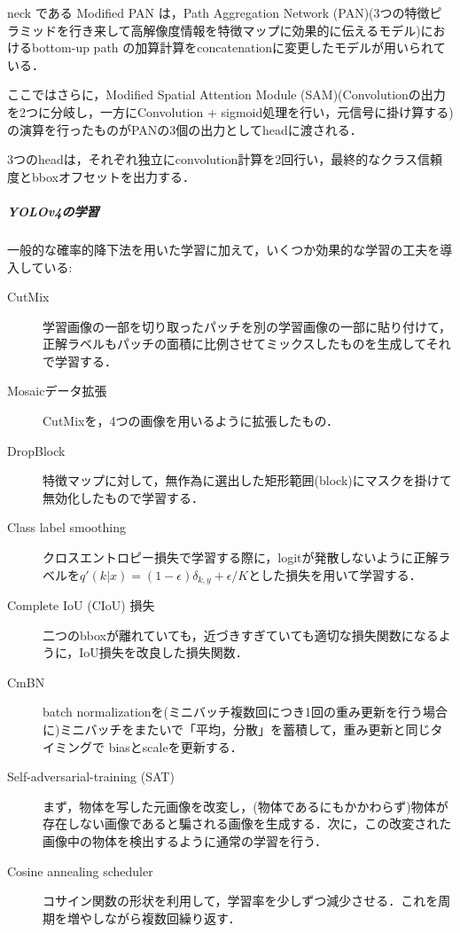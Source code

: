 \documentclass[twocolumn]{jsarticle} %
\begin{document}
neck である Modified PAN は，Path Aggregation Network (PAN)(3つの特徴ピラミッドを行き来して高解像度情報を特徴マップに効果的に伝えるモデル)におけるbottom-up path の加算計算をconcatenationに変更したモデルが用いられている．

ここではさらに，Modified Spatial Attention Module (SAM)(Convolutionの出力を2つに分岐し，一方にConvolution + sigmoid処理を行い，元信号に掛け算する)の演算を行ったものがPANの3個の出力としてheadに渡される．

3つのheadは，それぞれ独立にconvolution計算を2回行い，最終的なクラス信頼度とbboxオフセットを出力する．

\subparagraph{YOLOv4の学習}一般的な確率的降下法を用いた学習に加えて，いくつか効果的な学習の工夫を導入している: 

\begin{description}
    \item[CutMix] 学習画像の一部を切り取ったパッチを別の学習画像の一部に貼り付けて，正解ラベルもパッチの面積に比例させてミックスしたものを生成してそれで学習する．
    \item[Mosaicデータ拡張] CutMixを，4つの画像を用いるように拡張したもの．
    \item[DropBlock] 特徴マップに対して，無作為に選出した矩形範囲(block)にマスクを掛けて無効化したもので学習する．
    \item[Class label smoothing] クロスエントロピー損失で学習する際に，logitが発散しないように正解ラベルを$q'(k|x)=(1-\epsilon)\delta_{k,y}+\epsilon/K$とした損失を用いて学習する．
    \item[Complete IoU (CIoU) 損失] 二つのbboxが離れていても，近づきすぎていても適切な損失関数になるように，IoU損失を改良した損失関数．
    \item[CmBN] batch normalizationを(ミニバッチ複数回につき1回の重み更新を行う場合に)ミニバッチをまたいで「平均，分散」を蓄積して，重み更新と同じタイミングで biasとscaleを更新する．
    \item[Self-adversarial-training (SAT)] まず，物体を写した元画像を改変し，(物体であるにもかかわらず)物体が存在しない画像であると騙される画像を生成する．次に，この改変された画像中の物体を検出するように通常の学習を行う．
    \item[Cosine annealing scheduler] コサイン関数の形状を利用して，学習率を少しずつ減少させる．これを周期を増やしながら複数回繰り返す．
\end{description}
\end{document}

